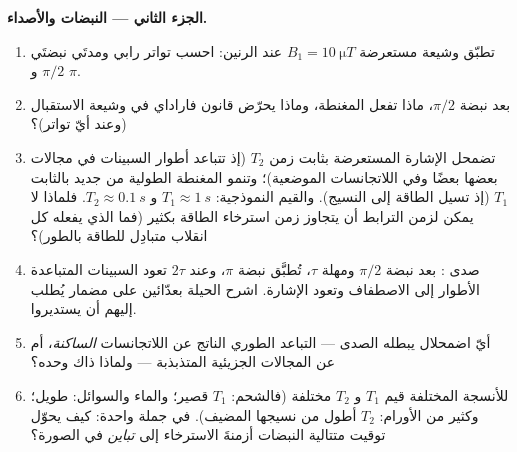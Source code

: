 \begin{problem}
\medskip\noindent\textbf{الجزء الثاني --- النبضات والأصداء.}
\begin{enumerate}[resume]
  \item تطبّق وشيعة مستعرضة $B_1 = \qty{10}{\micro T}$ عند
        الرنين: احسب تواتر رابي ومدتَي
        نبضتَي $\pi/2$ و $\pi$.
  \item بعد نبضة $\pi/2$، ماذا تفعل المغنطة،
        وماذا يحرّض قانون فاراداي في وشيعة الاستقبال (وعند
        أيّ تواتر)؟
  \item تضمحل الإشارة المستعرضة بثابت زمن $T_2$
        (إذ تتباعد أطوار السبينات في مجالات بعضها بعضًا وفي
        اللاتجانسات الموضعية)؛ وتنمو المغنطة الطولية من جديد
        بالثابت $T_1$ (إذ تسيل الطاقة إلى النسيج). والقيم النموذجية:
        $T_1 \approx \qty{1}{s}$ و $T_2 \approx \qty{0.1}{s}$. فلماذا
        لا يمكن لزمن الترابط أن يتجاوز زمن استرخاء الطاقة
        بكثير (فما الذي يفعله كل انقلاب متبادِل للطاقة
        بالطور)؟
  \item صدى : بعد نبضة $\pi/2$ ومهلة $\tau$،
        تُطبَّق نبضة $\pi$، وعند $2\tau$ تعود السبينات المتباعدة
        الأطوار إلى الاصطفاف وتعود الإشارة. اشرح الحيلة
        بعدّائين على مضمار يُطلب إليهم أن يستديروا.
  \item أيّ اضمحلال يبطله الصدى --- التباعد الطوري الناتج عن
        اللاتجانسات \emph{الساكنة}، أم عن المجالات الجزيئية
        المتذبذبة --- ولماذا ذاك وحده؟
  \item للأنسجة المختلفة قيم $T_1$ و $T_2$ مختلفة (فالشحم:
        $T_1$ قصير؛ والماء والسوائل: طويل؛ وكثير من الأورام: $T_2$
        أطول من نسيجها المضيف). في جملة واحدة: كيف يحوّل توقيت
        متتالية النبضات أزمنةَ الاسترخاء إلى \emph{تباين} في
        الصورة؟
\end{enumerate}


\end{problem}
